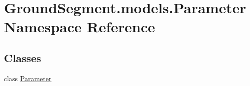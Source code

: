 \hypertarget{namespace_ground_segment_1_1models_1_1_parameter}{}\section{Ground\+Segment.\+models.\+Parameter Namespace Reference}
\label{namespace_ground_segment_1_1models_1_1_parameter}
\subsection*{Classes}
\begin{DoxyCompactItemize}
\item 
class \hyperlink{class_ground_segment_1_1models_1_1_parameter_1_1_parameter}{Parameter}
\end{DoxyCompactItemize}
